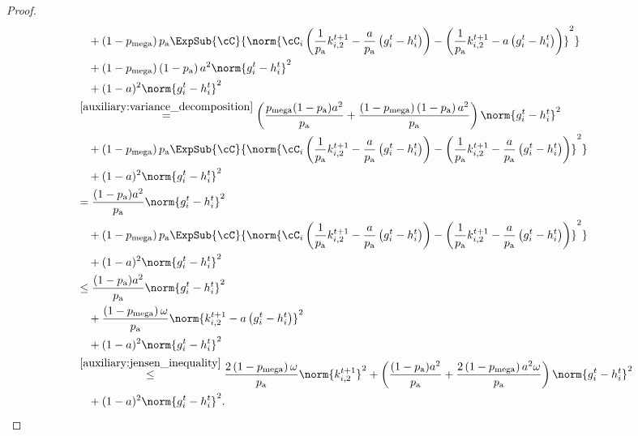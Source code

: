 \documentclass{article}
\newcommand*{\probavailable}{\ensuremath{p_{\textnormal{a}}}}
\newcommand*{\probmega}{\ensuremath{p_{\text{mega}}}}
\begin{document}
\begin{proof}
\begin{align*}
    &\quad + \left(1 - \probmega\right) \probavailable \ExpSub{\cC}{\norm{\cC_i\left(\frac{1}{\probavailable}k^{t+1}_{i, 2} - \frac{a}{\probavailable} \left(g^t_i - h^{t}_i\right)\right) - \left(\frac{1}{\probavailable} k^{t+1}_{i, 2} - a\left(g^{t}_{i} - h^{t}_{i}\right)\right)}^2} \\
    &\quad + \left(1 - \probmega\right) \left(1 - \probavailable\right) a^2 \norm{g^{t}_{i} - h^{t}_{i}}^2\\
    &\quad + (1 - a)^2 \norm{g^{t}_{i} - h^{t}_{i}}^2 \\
    &\overset{\eqref{auxiliary:variance_decomposition}}{=} \left(\frac{\probmega(1 - \probavailable) a^2}{\probavailable} + \frac{\left(1 - \probmega\right) \left(1 - \probavailable\right) a^2}{\probavailable}\right) \norm{g^{t}_{i} - h^{t}_{i}}^2 \\
    &\quad + \left(1 - \probmega\right) \probavailable \ExpSub{\cC}{\norm{\cC_i\left(\frac{1}{\probavailable}k^{t+1}_{i, 2} - \frac{a}{\probavailable} \left(g^t_i - h^{t}_i\right)\right) - \left(\frac{1}{\probavailable} k^{t+1}_{i, 2} - \frac{a}{\probavailable}\left(g^{t}_{i} - h^{t}_{i}\right)\right)}^2} \\
    &\quad + (1 - a)^2 \norm{g^{t}_{i} - h^{t}_{i}}^2 \\
    &= \frac{(1 - \probavailable) a^2}{\probavailable} \norm{g^{t}_{i} - h^{t}_{i}}^2 \\
    &\quad + \left(1 - \probmega\right) \probavailable \ExpSub{\cC}{\norm{\cC_i\left(\frac{1}{\probavailable}k^{t+1}_{i, 2} - \frac{a}{\probavailable} \left(g^t_i - h^{t}_i\right)\right) - \left(\frac{1}{\probavailable} k^{t+1}_{i, 2} - \frac{a}{\probavailable}\left(g^{t}_{i} - h^{t}_{i}\right)\right)}^2} \\
    &\quad + (1 - a)^2 \norm{g^{t}_{i} - h^{t}_{i}}^2 \\
    &\leq \frac{(1 - \probavailable) a^2}{\probavailable}\norm{g^{t}_{i} - h^{t}_{i}}^2 \\
    &\quad + \frac{\left(1 - \probmega\right) \omega}{\probavailable} \norm{k^{t+1}_{i, 2} - a \left(g^t_i - h^{t}_i\right)}^2 \\
    &\quad + (1 - a)^2 \norm{g^{t}_{i} - h^{t}_{i}}^2 \\
    &\overset{\eqref{auxiliary:jensen_inequality}}{\leq} \frac{2\left(1 - \probmega\right) \omega}{\probavailable} \norm{k^{t+1}_{i, 2}}^2 + \left(\frac{(1 - \probavailable) a^2}{\probavailable} + \frac{2 \left(1 - \probmega\right) a^2 \omega}{\probavailable}\right)\norm{g^{t}_{i} - h^{t}_{i}}^2 \\
    &\quad + (1 - a)^2 \norm{g^{t}_{i} - h^{t}_{i}}^2.
  \end{align*}
\end{proof}
\end{document}
